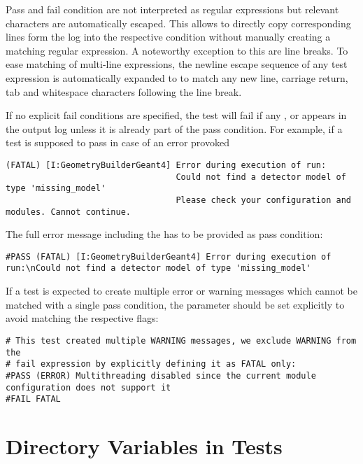 Pass and fail condition are not interpreted as regular expressions but relevant characters are automatically escaped.
This allows to directly copy corresponding lines form the log into the respective condition without manually creating a matching regular expression.
A noteworthy exception to this are line breaks.
To ease matching of multi-line expressions, the newline escape sequence \parameter{\n} of any test expression is automatically expanded to \parameter{[\r\n\t ]*} to match any new line, carriage return, tab and whitespace characters following the line break.

If no explicit fail conditions are specified, the test will fail if any ,  or  appears in the output log unless it is already part of the pass condition.
For example, if a test is supposed to pass in case of an error provoked

\begin{verbatim}
(FATAL) [I:GeometryBuilderGeant4] Error during execution of run:
                                  Could not find a detector model of type 'missing_model'
                                  Please check your configuration and modules. Cannot continue.
\end{verbatim}

The full error message including the  has to be provided as pass condition:

\begin{verbatim}
#PASS (FATAL) [I:GeometryBuilderGeant4] Error during execution of run:\nCould not find a detector model of type 'missing_model'
\end{verbatim}

If a test is expected to create multiple error or warning messages which cannot be matched with a single pass condition, the  parameter should be set explicitly to avoid matching the respective flags:

\begin{verbatim}
# This test created multiple WARNING messages, we exclude WARNING from the
# fail expression by explicitly defining it as FATAL only:
#PASS (ERROR) Multithreading disabled since the current module configuration does not support it
#FAIL FATAL
\end{verbatim}

\section{Directory Variables in Tests}

